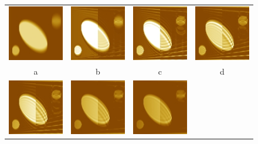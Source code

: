 \documentclass{procDDs}
\begin{document}
\begin{figure}[h!]\center%
	\begin{tabular}{cccc}
		\includegraphics[width=0.2\linewidth]{img/9/1.jpg}&
		\includegraphics[width=0.2\linewidth]{img/9/3.jpg}&
		\includegraphics[width=0.2\linewidth]{img/9/4.jpg}&
		\includegraphics[width=0.2\linewidth]{img/9/5.jpg}\\
		a & b & c & d\\
		\includegraphics[width=0.2\linewidth]{img/9/6.jpg}&
		\includegraphics[width=0.2\linewidth]{img/9/7.jpg}&
		\includegraphics[width=0.2\linewidth]{img/9/8.jpg}&

\end{tabular}
\end{figure}
\end{document}
